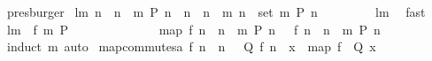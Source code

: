 \begin{isabellebody}
\ presburger\isanewline
{}\isamarkupfalse%
%
\endisatagproof
{\isafoldproof}%
%
\isadelimproof
\isanewline
%
\endisadelimproof
\isanewline
{}\isamarkupfalse%
\ lm{}{}{\isacharcolon}\ {\isachardoublequoteopen}{\isacharbrackleft}n\ {\isachardot}\ n\ {\isacharless}{\isacharminus}\ {\isacharbrackleft}{}{\isachardot}{\isachardot}{\isacharless}m{\isacharbrackright}{\isacharcomma}\ P\ n{\isacharbrackright}\ {\isacharequal}\ {\isacharbrackleft}n\ {\isachardot}\ n\ {\isacharless}{\isacharminus}\ {\isacharbrackleft}{}{\isachardot}{\isachardot}{\isacharless}m{\isacharbrackright}{\isacharcomma}\ n\ {\isasymin}\ set\ {\isacharbrackleft}{}{\isachardot}{\isachardot}{\isacharless}m{\isacharbrackright}{\isacharcomma}\ P\ n{\isacharbrackright}{\isachardoublequoteclose}\ \isanewline
%
\isadelimproof
\ \ \ \ \ \ %
\endisadelimproof
%
\isatagproof
{}\isamarkupfalse%
\ lm{}{}\ \isamarkupfalse%
\ fast%
\endisatagproof
{\isafoldproof}%
%
\isadelimproof
\isanewline
%
\endisadelimproof
\ \isanewline
\isanewline
{}\isamarkupfalse%
\ lm{}{}{\isacharcolon}\ \ f\ m\ P\ \isanewline
\ \ \ \ \ \ \ \ \ \ \ \ \ {\isachardoublequoteopen}{\isacharparenleft}map\ f\ {\isacharbrackleft}n\ {\isachardot}\ n\ {\isacharless}{\isacharminus}\ {\isacharbrackleft}{}{\isachardot}{\isachardot}{\isacharless}m{\isacharbrackright}{\isacharcomma}\ P\ n{\isacharbrackright}{\isacharparenright}\ {\isacharequal}\ {\isacharbrackleft}\ f\ n\ {\isachardot}\ n\ {\isacharless}{\isacharminus}\ {\isacharbrackleft}{}{\isachardot}{\isachardot}{\isacharless}m{\isacharbrackright}{\isacharcomma}\ P\ n{\isacharbrackright}{\isachardoublequoteclose}\ \isanewline
%
\isadelimproof
\ \ \ \ \ \ %
\endisadelimproof
%
\isatagproof
{}\isamarkupfalse%
\ {\isacharparenleft}induct\ m{\isacharparenright}\ auto%
\endisatagproof
{\isafoldproof}%
%
\isadelimproof
\isanewline
%
\endisadelimproof
\isanewline
\isanewline
{}\isamarkupfalse%
\ map{\isacharunderscore}commutes{\isacharunderscore}a{\isacharcolon}\ {\isachardoublequoteopen}{\isacharbrackleft}f\ n\ {\isachardot}\ n\ {\isacharless}{\isacharminus}\ {\isacharbrackleft}{\isacharbrackright}{\isacharcomma}\ Q\ {\isacharparenleft}f\ n{\isacharparenright}{\isacharbrackright}\ {\isacharequal}\ {\isacharbrackleft}x\ {\isacharless}{\isacharminus}\ {\isacharparenleft}map\ f\ {\isacharbrackleft}{\isacharbrackright}{\isacharparenright}{\isachardot}\ Q\ x{\isacharbrackright}{\isachardoublequoteclose}\ \isanewline

\end{isabellebody}
